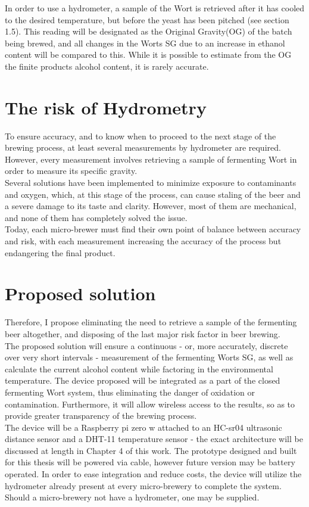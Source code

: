 \documentclass[twoside]{ctuthesis}
\theoremstyle{plain}
\theoremstyle{definition}
\theoremstyle{note}
\begin{document}
In order to use a hydrometer, a sample of the Wort is retrieved after it has cooled to the desired temperature, but before the yeast has been pitched (see section 1.5). This reading will be designated as the Original Gravity(OG) of the batch being brewed, and all changes in the Worts SG due to an increase in ethanol content will be compared to this. While it is possible to estimate from the OG the finite products alcohol content, it is rarely accurate.

\section{The risk of Hydrometry}
To ensure accuracy, and to know when to proceed to the next stage of the brewing process, at least several measurements by hydrometer are required. However, every measurement involves retrieving a sample of fermenting Wort in order to measure its specific gravity.\\
Several solutions have been implemented to minimize exposure to contaminants and oxygen, which, at this stage of the process, can cause staling of the beer and a severe damage to its taste and clarity. However, most of them are mechanical, and none of them has completely solved the issue.\\
Today, each micro-brewer must find their own point of balance between accuracy and risk, with each measurement increasing the accuracy of the process but endangering the final product.



\section{Proposed solution}
Therefore, I propose eliminating the need to retrieve a sample of the fermenting beer altogether, and disposing of the last major risk factor in beer brewing.\\
The proposed solution will ensure a continuous - or, more accurately, discrete over very short intervals - measurement of the fermenting Worts SG, as well as calculate the current alcohol content while factoring in the environmental temperature. The device proposed will be integrated as a part of the closed fermenting Wort system, thus eliminating the danger of oxidation or contamination. Furthermore, it will allow wireless access to the results, so as to provide greater transparency of the brewing process.\\
The device will be a Raspberry pi zero w attached to an HC-sr04 ultrasonic distance sensor and a DHT-11 temperature sensor - the exact architecture will be discussed at length in Chapter 4 of this work. The prototype designed and built for this thesis will be powered via cable, however future version may be battery operated. In order to ease integration and reduce costs, the device will utilize the hydrometer already present at every micro-brewery to complete the system. Should a micro-brewery not have a hydrometer, one may be supplied.\\
\end{document}
